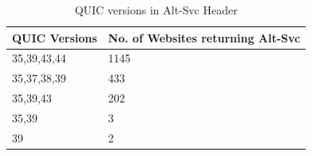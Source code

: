\begin{frame}

\begin{table}[ht]
    \begin{tabular}{@{}|l|l|@{}}
        \toprule
        \textbf{QUIC Versions} & \textbf{No. of Websites returning Alt-Svc} \\ \midrule
        35,39,43,44            & 1145                                       \\ \midrule
        35,37,38,39            & 433                                        \\ \midrule
        35,39,43               & 202                                        \\ \midrule
        35,39                  & 3                                          \\ \midrule
        39                     & 2                                          \\ \bottomrule
    \end{tabular}
    \caption{QUIC versions in Alt-Svc Header}\label{fig:quic-versions-in}
\end{table}

%

%


\end{frame}

